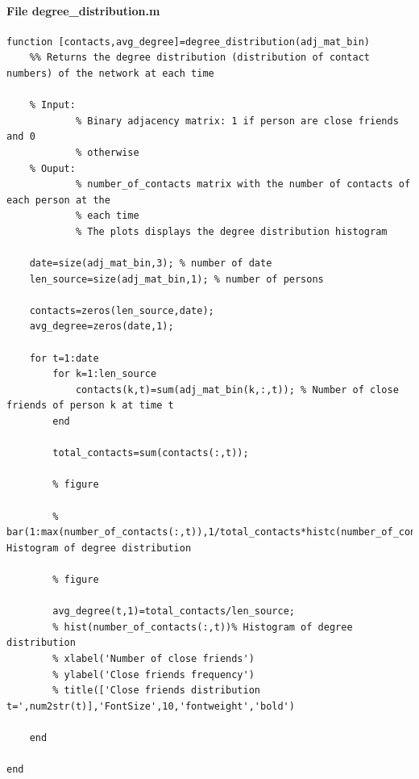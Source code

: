 \documentclass[11pt]{article}
\begin{document}
\paragraph{File degree\_distribution.m}
\begin{verbatim}
function [contacts,avg_degree]=degree_distribution(adj_mat_bin)
    %% Returns the degree distribution (distribution of contact numbers) of the network at each time
    
    % Input:
            % Binary adjacency matrix: 1 if person are close friends and 0
            % otherwise
    % Ouput:
            % number_of_contacts matrix with the number of contacts of each person at the
            % each time
            % The plots displays the degree distribution histogram
            
    date=size(adj_mat_bin,3); % number of date
    len_source=size(adj_mat_bin,1); % number of persons
    
    contacts=zeros(len_source,date);
    avg_degree=zeros(date,1);
    
    for t=1:date
        for k=1:len_source
            contacts(k,t)=sum(adj_mat_bin(k,:,t)); % Number of close friends of person k at time t 
        end

        total_contacts=sum(contacts(:,t));
          
        % figure

        % bar(1:max(number_of_contacts(:,t)),1/total_contacts*histc(number_of_contacts(:,t),1:max(number_of_contacts(:,t))),'histc')% Histogram of degree distribution
        
        % figure
        
        avg_degree(t,1)=total_contacts/len_source;
        % hist(number_of_contacts(:,t))% Histogram of degree distribution
        % xlabel('Number of close friends')
        % ylabel('Close friends frequency')
        % title(['Close friends distribution t=',num2str(t)],'FontSize',10,'fontweight','bold')
        
    end
 
end
\end{verbatim}
\end{document}
